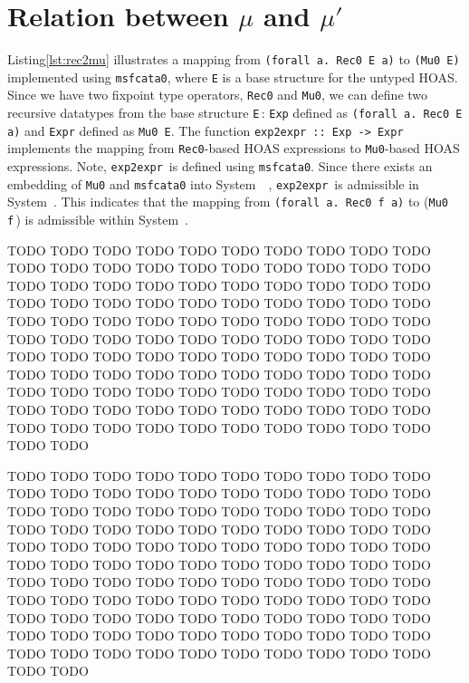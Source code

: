 \section{Relation between $\mu$ and $\mu'$}\label{sec:murec}
Listing\;\ref{lst:rec2mu} illustrates a mapping from
\lstinline{(forall a. Rec0 E a)}  to \lstinline{(Mu0 E)} implemented
using \lstinline{msfcata0}, where \lstinline{E} is a base structure
for the untyped HOAS. Since we have two fixpoint type operators,
\lstinline{Rec0} and \lstinline{Mu0}, we can define two recursive datatypes
from the base structure \lstinline{E}\,:
\lstinline{Exp} defined as \lstinline{(forall a. Rec0 E a)} and
\lstinline{Expr} defined as \lstinline{Mu0 E}.
The function \lstinline{exp2expr :: Exp -> Expr}\, implements the mapping from
\lstinline{Rec0}-based HOAS expressions to \lstinline{Mu0}-based
HOAS expressions. Note, \lstinline{exp2expr}\, is defined
using \lstinline{msfcata0}.  Since there exists an embedding of
\lstinline{Mu0} and \lstinline{msfcata0} into System~\Fw\ \cite{AhnShe11},
\lstinline{exp2expr}\, is admissible in System~\Fw.
This indicates that the mapping from \lstinline{(forall a. Rec0 f a)} to
(\lstinline{Mu0 f}\,) is admissible within System~\Fw.


TODO TODO TODO TODO TODO TODO TODO TODO TODO TODO TODO TODO TODO TODO
TODO TODO TODO TODO TODO TODO TODO TODO TODO TODO TODO TODO TODO TODO
TODO TODO TODO TODO TODO TODO TODO TODO TODO TODO TODO TODO TODO TODO
TODO TODO TODO TODO TODO TODO TODO TODO TODO TODO TODO TODO TODO TODO
TODO TODO TODO TODO TODO TODO TODO TODO TODO TODO TODO TODO TODO TODO
TODO TODO TODO TODO TODO TODO TODO TODO TODO TODO TODO TODO TODO TODO
TODO TODO TODO TODO TODO TODO TODO TODO TODO TODO TODO TODO TODO TODO
TODO TODO TODO TODO TODO TODO TODO TODO TODO TODO TODO TODO TODO TODO


\begin{figure}

\vspace*{-3ex}
\end{figure}

TODO TODO TODO TODO TODO TODO TODO TODO TODO TODO TODO TODO TODO TODO
TODO TODO TODO TODO TODO TODO TODO TODO TODO TODO TODO TODO TODO TODO
TODO TODO TODO TODO TODO TODO TODO TODO TODO TODO TODO TODO TODO TODO
TODO TODO TODO TODO TODO TODO TODO TODO TODO TODO TODO TODO TODO TODO
TODO TODO TODO TODO TODO TODO TODO TODO TODO TODO TODO TODO TODO TODO
TODO TODO TODO TODO TODO TODO TODO TODO TODO TODO TODO TODO TODO TODO
TODO TODO TODO TODO TODO TODO TODO TODO TODO TODO TODO TODO TODO TODO
TODO TODO TODO TODO TODO TODO TODO TODO TODO TODO TODO TODO TODO TODO



